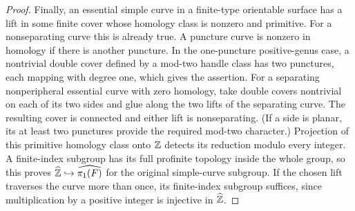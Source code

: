 \begin{proof}
Finally, an essential simple curve in a finite-type orientable surface has a
lift in some finite cover whose homology class is nonzero and primitive.
For a nonseparating curve this is already true.  A puncture curve is nonzero
in homology if there is another puncture.  In the one-puncture positive-genus
case, a nontrivial double cover defined by a mod-two handle class has two
punctures, each mapping with degree one, which gives the assertion.  For a
separating nonperipheral essential curve with zero homology, take double
covers nontrivial on each of its two sides and glue along the two lifts of
the separating curve.  The resulting cover is connected and either lift is
nonseparating.  (If a side is planar, its at least two punctures provide the
required mod-two character.)  Projection of this primitive homology class
onto $\mathbb Z$ detects its reduction modulo every integer.  A finite-index
subgroup has its full profinite topology inside the whole group, so this
proves $\widehat{\mathbb Z}\hookrightarrow\widehat{\pi_1(F)}$ for the original
simple-curve subgroup.  If the chosen lift traverses the curve more than once,
its finite-index subgroup suffices, since multiplication by a positive integer
is injective in $\widehat{\mathbb Z}$.
\end{proof}


